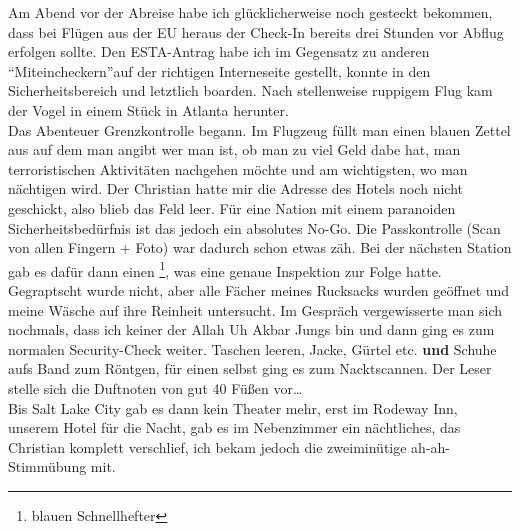 Am Abend vor der Abreise habe ich glücklicherweise noch gesteckt bekommen, dass bei Flügen aus der EU heraus der Check-In bereits drei Stunden vor Abflug erfolgen sollte.
Den ESTA-Antrag habe ich \textendash im Gegensatz zu anderen \textquotedblleft Mit\-ein\-checkern\textquotedblright \textendash auf der richtigen Interneseite gestellt, konnte in den Sicherheitsbereich und letztlich boarden.
Nach stellenweise ruppigem Flug kam der Vogel in einem Stück in Atlanta herunter.\\

Das Abenteuer Grenzkontrolle begann.
Im Flugzeug füllt man einen blauen Zettel aus auf dem man angibt wer man ist, ob man zu viel Geld dabe hat, man terroristischen Aktivitäten nachgehen möchte und am wichtigsten, wo man nächtigen wird.
Der Christian hatte mir die Adresse des Hotels noch nicht geschickt, also blieb das Feld leer.
Für eine Nation mit einem paranoiden Sicherheitsbedürfnis ist das jedoch ein absolutes No-Go.
Die Passkontrolle (Scan von allen Fingern + Foto) war dadurch schon etwas zäh.
Bei der nächsten Station gab es dafür dann einen \footnote{blauen Schnellhefter}, was eine genaue Inspektion zur Folge hatte.
Gegraptscht wurde nicht, aber alle Fächer meines Rucksacks wurden geöffnet und meine Wäsche auf ihre Reinheit untersucht.
Im Gespräch vergewisserte man sich nochmals, dass ich keiner der Allah Uh Akbar Jungs bin und dann ging es zum normalen Security-Check weiter.
Taschen leeren, Jacke, Gürtel etc. \textbf{und} Schuhe aufs Band zum Röntgen, für einen selbst ging es zum Nacktscannen.
Der Leser stelle sich die Duftnoten von gut 40 Füßen vor\dots\\

Bis Salt Lake City gab es dann kein Theater mehr, erst im Rodeway Inn, unserem Hotel für die Nacht, gab es im Nebenzimmer ein nächtliches, das Christian komplett verschlief, ich bekam jedoch die zweiminütige ah-ah-Stimmübung mit.